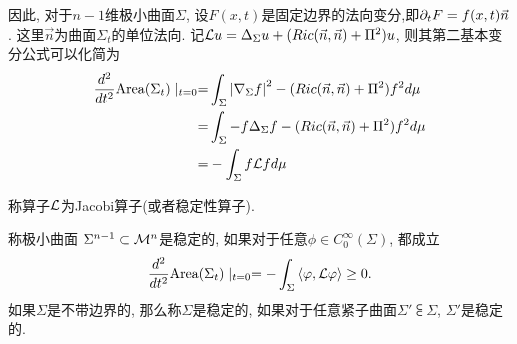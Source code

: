 因此, 对于$n-1$维极小曲面$\Sigma$, 设$F(x,t)$是固定边界的法向变分,即${\partial_t F}=f(x,t)\vec{n}$. 这里$\vec{n}$为曲面$\Sigma_t$的单位法向. 记$\mathcal{L} u=\Delta_\Sigma u+(Ric(\vec{n},\vec{n})+{\Pi}^2)u$, 则其第二基本变分公式可以化简为
\begin{equation}
    \begin{split}
        \frac{d^2}{dt^2} \text{Area}(\Sigma_t)\mid_{t=0} =&  \int_\Sigma {\left | \nabla_\Sigma f \right |}^2-(Ric(\vec{n},\vec{n})+{\Pi}^2)f^2{d\mu} \\
        =& \int_\Sigma -f\Delta_\Sigma f-(Ric(\vec{n},\vec{n})+{\Pi}^2)f^2{d\mu} \\
        =& -\int_\Sigma f\mathcal{L} f{d\mu}
    \end{split}
\end{equation}
\begin{definition}
    称算子$\mathcal{L}$为Jacobi算子(或者稳定性算子).
\end{definition}
\begin{definition}
    称极小曲面 $\Sigma^{n-1} \subset {\mathcal{M}}^n$是稳定的, 如果对于任意$\phi \in C^\infty_0(\Sigma)$, 都成立
    \begin{equation} \label{stability_def}
        \frac{d^2}{dt^2} \text{Area}(\Sigma_t) \mid_{t=0} = -\int_{\Sigma}{\left < {\varphi}, \mathcal{L}{\varphi} \right >} \ge 0.
    \end{equation}
    如果$\Sigma$是不带边界的, 那么称$\Sigma$是稳定的, 如果对于任意紧子曲面$\Sigma'\subsub \Sigma$, $\Sigma'$是稳定的.
\end{definition}
